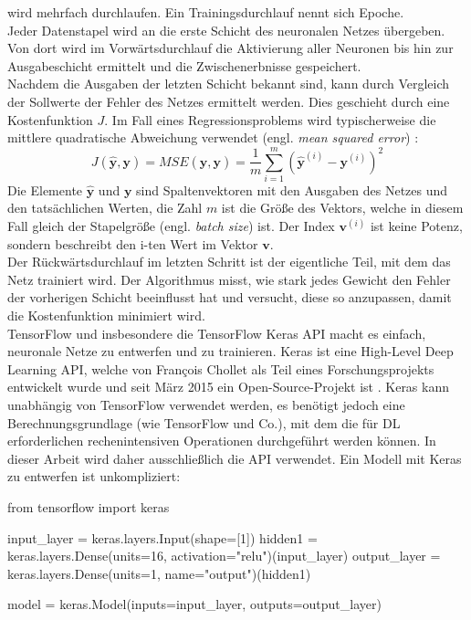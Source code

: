 wird mehrfach durchlaufen. Ein Trainingsdurchlauf nennt sich Epoche.\\[4pt]
Jeder Datenstapel wird an die erste Schicht des neuronalen Netzes
übergeben. Von dort wird im Vorwärtsdurchlauf die Aktivierung aller
Neuronen bis hin zur Ausgabeschicht ermittelt und die Zwischenerbnisse gespeichert.\\[4pt]
Nachdem die Ausgaben der letzten Schicht bekannt sind, kann
durch Vergleich der Sollwerte der Fehler des Netzes ermittelt werden.
Dies geschieht durch eine Kostenfunktion $J$. Im Fall eines Regressionsproblems
wird typischerweise die mittlere quadratische Abweichung verwendet
(engl. \textit{mean squared error}) \parencite[113-114]{book:hands-on-ml}:
\begin{equation}
  J(\mathbf{\hat{y}}, \mathbf{y}) =
  MSE(\mathbf{\hat{y}}, \mathbf{y}) =
    \frac{1}{m} \sum_{i=1}^{m} (\mathbf{\hat{y}}^{(i)} - \mathbf{y}^{(i)})^2
  \label{eq:mse}
\end{equation}
Die Elemente $\mathbf{\hat{y}}$ und $\mathbf{y}$ sind Spaltenvektoren
mit den Ausgaben des Netzes und den tatsächlichen Werten, die Zahl $m$
ist die Größe des Vektors, welche in diesem Fall gleich der Stapelgröße
(engl. \textit{batch size}) ist. Der Index $\mathbf{v}^{(i)}$ ist keine Potenz,
sondern beschreibt den i-ten Wert im Vektor $\mathbf{v}$.\\[4pt]
Der Rückwärtsdurchlauf im letzten Schritt ist der eigentliche Teil,
mit dem das Netz
trainiert wird. Der Algorithmus misst, wie stark jedes Gewicht den Fehler der
vorherigen Schicht beeinflusst hat und versucht, diese so anzupassen,
damit die Kostenfunktion minimiert wird.\\[8pt]
TensorFlow und insbesondere die TensorFlow Keras API
macht es einfach, neuronale Netze zu entwerfen und zu trainieren.
Keras ist eine High-Level Deep Learning API, welche
von François Chollet als Teil eines Forschungsprojekts entwickelt
wurde und seit März 2015 ein Open-Source-Projekt ist
\parencite[295]{book:hands-on-ml}. Keras kann
unabhängig von TensorFlow verwendet werden, es benötigt
jedoch eine Berechnungsgrundlage (wie TensorFlow und Co.),
mit dem die für DL erforderlichen rechenintensiven Operationen durchgeführt werden können.
In dieser Arbeit wird daher ausschließlich die  API
verwendet. Ein Modell mit Keras zu entwerfen ist unkompliziert:
\begin{pythoncode}
from tensorflow import keras

input_layer = keras.layers.Input(shape=[1])
hidden1 = keras.layers.Dense(units=16, activation="relu")(input_layer)
output_layer = keras.layers.Dense(units=1, name="output")(hidden1)

model = keras.Model(inputs=input_layer, outputs=output_layer)
\end{pythoncode}
